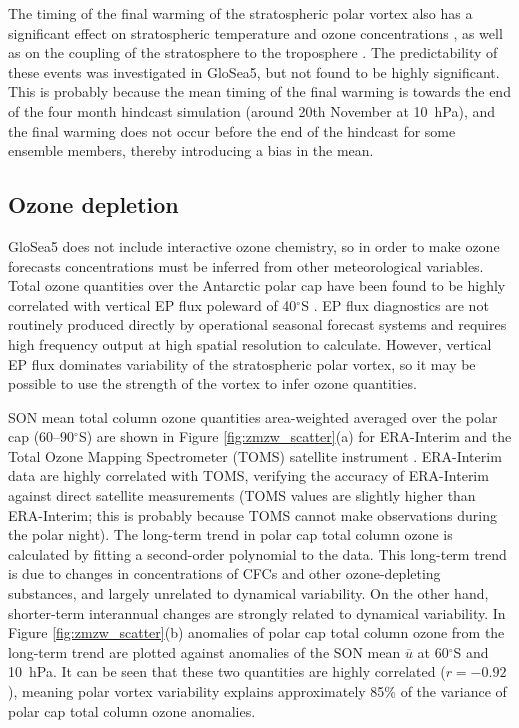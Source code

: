 The timing of the final warming of the stratospheric polar vortex also has a
significant effect on stratospheric temperature and ozone concentrations
\citep{Yamazaki1987}, as well as on the coupling of the stratosphere to the
troposphere \citep{Black2007}. The predictability of these events was
investigated in GloSea5, but not found to be highly significant. This is
probably because the mean timing of the final warming is towards the end of the
four month hindcast simulation (around 20th November at 10~hPa), and the final
warming does not occur before the end of the hindcast for some ensemble members,
thereby introducing a bias in the mean.

\subsection{Ozone depletion}

GloSea5 does not include interactive ozone chemistry, so in order to make ozone
forecasts concentrations must be inferred from other meteorological
variables. Total ozone quantities over the Antarctic polar cap have been found
to be highly correlated with vertical EP flux poleward of 40$^{\circ}$S
\citep{Weber2011, Salby2012}. EP flux diagnostics are not routinely produced
directly by operational seasonal forecast systems and requires high frequency
output at high spatial resolution to calculate. However, vertical EP flux
dominates variability of the stratospheric polar vortex, so it may be possible
to use the strength of the vortex to infer ozone quantities.

SON mean total column ozone quantities area-weighted averaged over the polar cap
(60--90$^{\circ}$S) are shown in Figure \ref{fig:zmzw_scatter}(a) for
ERA-Interim and the Total Ozone Mapping Spectrometer (TOMS) satellite instrument
\citep{Kroon2008}. ERA-Interim data are highly correlated with TOMS, verifying
the accuracy of ERA-Interim against direct satellite measurements (TOMS values
are slightly higher than ERA-Interim; this is probably because TOMS cannot make
observations during the polar night). The long-term trend in polar cap total
column ozone is calculated by fitting a second-order polynomial to the
data. This long-term trend is due to changes in concentrations of CFCs and other
ozone-depleting substances, and largely unrelated to dynamical variability. On
the other hand, shorter-term interannual changes are strongly related to
dynamical variability. In Figure \ref{fig:zmzw_scatter}(b) anomalies of polar
cap total column ozone from the long-term trend are plotted against anomalies of
the SON mean $\overline{u}$ at 60$^{\circ}$S and 10~hPa. It can be seen that
these two quantities are highly correlated ($r=-0.92$), meaning polar vortex
variability explains approximately 85\% of the variance of polar cap total
column ozone anomalies.

